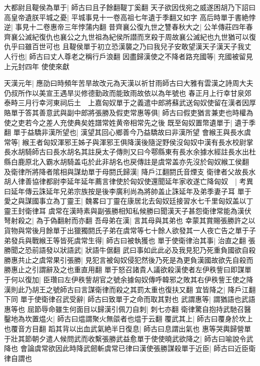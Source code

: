 大都尉且鞮侯為單于|{
	師古曰且子餘翻鞮丁奚翻}
天子欲因伐宛之威遂困胡乃下詔曰高皇帝遺朕平城之憂|{
	平城事見十一卷高祖七年遺于季翻又如字}
高后時單于書絶悖逆|{
	事見十二卷惠帝三年悖蒲内翻}
昔齊襄公復九世之讐春秋大之|{
	公羊傳莊四年春齊襄公滅紀復仇也襄公之九世祖為紀侯所譛而烹殺于周故襄公滅紀也九世猶可以復仇乎曰雖百世可也}
且鞮侯單于初立恐漢襲之乃曰我兒子安敢望漢天子漢天子我丈人行也|{
	師古曰丈人尊老之稱行戶浪翻}
因盡歸漢使之不降者路充國等|{
	充國被留見上元封四年}
使使來獻

天漢元年|{
	應劭曰時頻年苦旱故改元為天漢以祈甘雨師古曰大雅有雲漢之詩周大夫仍叔所作以美宣王遇旱災修德勤政而能致雨故依以為年號也}
春正月上行幸甘泉郊泰畤三月行幸河東祠后土　上嘉匈奴單于之義遣中郎將蘇武送匈奴使留在漢者因厚賂單于答其善意武與副中郎將張勝及假吏常惠等俱|{
	師古曰假吏猶言兼吏也時權為使之吏若今之差人充使典矣姓譜常姓黄帝相常先之後}
既至匈奴置幣遺單于|{
	遺于季翻}
單于益驕非漢所望也|{
	漢望其回心鄉善今乃益驕故曰非漢所望}
會緱王與長水虞常等|{
	緱王者匈奴渾邪王姊子與渾邪王俱降漢後隨浞野侯沒匈奴中漢有長水校尉掌長水胡騎師古曰長水胡名其註戾太子傳則又曰今鄠縣東有長水余據水經註長水出杜縣白鹿原北入霸水胡騎盖屯於此非胡名也戻傳註是虞常盖亦先沒於匈奴緱工侯翻}
及衛律所將降者隂相與謀劫單于母閼氏歸漢|{
	降戶江翻閼氏音煙支}
衛律者父故長水胡人律善協律都尉李延年延年薦言律使於匈奴使還聞延年家收遂亡降匈奴　|{
	考異曰延年傳云誅延年兄弟宗族按是後李廣利尚為將帥盖止誅延年及弟季妻子耳}
單于愛之與謀國事立為丁靈王|{
	魏畧曰丁靈在康居北去匈奴廷接習水七千里匈奴盖以丁靈王封衛律耳}
虞常在漢時素與副張勝相知私候勝曰聞漢天子甚怨衛律常能為漢伏弩射殺之|{
	為于偽翻射而亦翻}
吾母弟在漢|{
	言其母與其弟也}
幸蒙其賞賜張勝許之以貨物與常後月餘單于出獵獨閼氏子弟在虞常等七十餘人欲發其一人夜亡告之單于子弟發兵與戰緱王等皆死虞常生得|{
	師古曰被執獲也}
單于使衛律治其事|{
	治直之翻}
張勝聞之恐前語發以狀語武|{
	狀語牛倨翻}
武曰事如此此必及我見犯乃死重負國欲自殺勝惠共止之虞常果引張勝|{
	見犯言被匈奴侵犯然後乃死是為更負漢國故欲先自殺而勝惠止之引謂辭及之也重直用翻}
單于怒召諸貴人議欲殺漢使者左伊秩訾曰即謀單于何以復加|{
	臣瓚曰左伊秩訾胡官之號余據匈奴傳呼韓邪之敗其右伊秩訾王使之降漢則此乃胡王之號師古曰言謀衛律而殺之其罰太重也復扶又翻}
宜皆降之|{
	降戶江翻下同}
單于使衛律召武受辭|{
	師古曰致單于之命而取其對也}
武謂惠等|{
	謂猶語也武語惠等也}
屈節辱命雖生何面目以歸漢引佩刀自刺|{
	刺七亦翻}
衛律驚自抱持武馳召醫鑿地為坎置煴火|{
	師古曰煴謂聚火無燄者也煴于云翻}
覆武其上|{
	師古曰覆身於坎上也覆音方目翻}
蹈其背以出血武氣絶半日復息|{
	師古曰息謂出氣也}
惠等哭輿歸營單于壯其節朝夕遣人候問武而收繫張勝武益愈單于使使曉武欲降之|{
	師古曰喻說令武降也}
會論虞常欲因此時降武劒斬虞常已律曰漢使張勝謀殺單于近臣|{
	師古曰近臣衛律自謂也}

